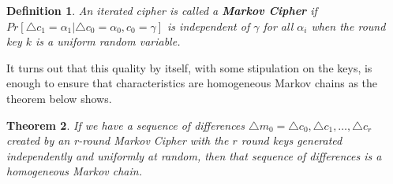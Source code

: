 \documentclass[12pt,a4paper]{article}
\newtheorem{theorem}{Theorem}
\newtheorem{definition}[theorem]{Definition}
\begin{document}
\begin{definition}
An iterated cipher is called a \textbf{Markov Cipher} if $Pr[\triangle c_1 = \alpha_1 |
\triangle c_0 = \alpha_0, c_0 = \gamma]$ is independent of $\gamma$ for all
$\alpha_i$ when the round key $k$ is a uniform random variable.
\end{definition}

It turns out that this quality by itself, with some stipulation on the keys, is
enough to ensure that characteristics are homogeneous Markov chains as the
theorem below shows.

\begin{theorem}
\label{thm:markov}
If we have a sequence of differences $\triangle m_0 = \triangle c_0, \triangle
c_1, \ldots, \triangle c_r$ created by an r-round Markov Cipher with the $r$ round keys
generated independently and uniformly at random, then that sequence of
differences is a homogeneous Markov chain.
\end{theorem}
\end{document}
